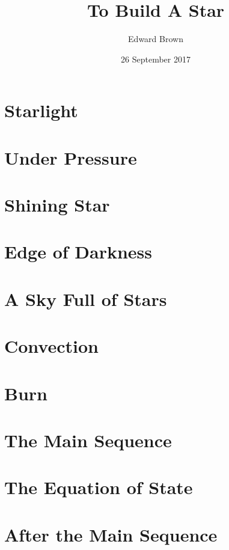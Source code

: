 \documentclass[profonts,stix,symmetric]{astro-bookshelf}
\title{To Build A Star}
\author{Edward Brown}
\date{26 September 2017}
\begin{document}
\frontmatter
{}


\mainmatter
{}
\setcounter{page}{1}

\chapter{Starlight}\label{ch.starlight}


\chapter{Under Pressure}\label{ch.basic-stellar-properties}


\chapter{Shining Star}\label{ch.radiative-transport}


\chapter{Edge of Darkness}\label{ch.stellar-atmospheres}


\chapter{A Sky Full of Stars}\label{ch.classifying-stars}


\chapter{Convection}\label{ch.convection}


\chapter{Burn}\label{ch.nuclear-burning}


\chapter{The Main Sequence}\label{ch.main-sequence}


\chapter{The Equation of State}\label{ch.degeneracy}


\chapter{After the Main Sequence}\label{ch.post-main-sequence}



\backmatter


\end{document}
